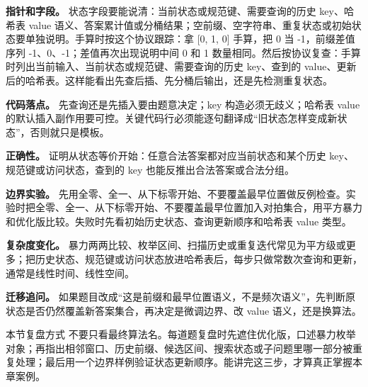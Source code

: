 \textbf{指针和字段。} 状态字段要能说清：当前状态或规范键、需要查询的历史 key、哈希表 value 语义、答案累计值或分桶结果；空前缀、空字符串、重复状态或初始状态要单独说明。手算时按这个协议跟踪：拿 [0, 1, 0] 手算，把 0 当 -1，前缀差值序列 -1、0、-1；差值再次出现说明中间 0 和 1 数量相同。然后按协议复查：手算时列出当前输入、当前状态或规范键、需要查询的历史 key、查到的 value、更新后的哈希表。这样能看出先查后插、先分桶后输出，还是先检测重复状态。

\textbf{代码落点。} 先查询还是先插入要由题意决定；key 构造必须无歧义；哈希表 value 的默认插入副作用要可控。关键代码行必须能逐句翻译成“旧状态怎样变成新状态”，否则就只是模板。

\textbf{正确性。} 证明从状态等价开始：任意合法答案都对应当前状态和某个历史 key、规范键或访问状态，查到的 key 也能反推出合法答案或合法分组。

\textbf{边界实验。} 先用全零、全一、从下标零开始、不要覆盖最早位置做反例检查。实验时把全零、全一、从下标零开始、不要覆盖最早位置加入对拍集合，用平方暴力和优化版比较。失败时先看初始历史状态、查询更新顺序和哈希表 value 类型。

\textbf{复杂度变化。} 暴力两两比较、枚举区间、扫描历史或重复迭代常见为平方级或更多；把历史状态、规范键或访问状态放进哈希表后，每步只做常数次查询和更新，通常是线性时间、线性空间。

\textbf{迁移追问。} 如果题目改成“这是前缀和最早位置语义，不是频次语义”，先判断原状态是否仍然覆盖新答案集合，再决定是微调边界、改 value 语义，还是换算法。

\begin{principlebox}{本节复盘方式}
不要只看最终算法名。每道题复盘时先遮住优化版，口述暴力枚举对象；再指出相邻窗口、历史前缀、候选区间、搜索状态或子问题里哪一部分被重复处理；最后用一个边界样例验证状态更新顺序。能讲完这三步，才算真正掌握本章案例。
\end{principlebox}
